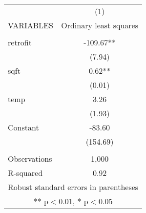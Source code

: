 \begin{tabular}{lc} \hline
 & (1) \\
VARIABLES & Ordinary least squares \\ \hline
 &  \\
retrofit & -109.67** \\
 & (7.94) \\
sqft & 0.62** \\
 & (0.01) \\
temp & 3.26 \\
 & (1.93) \\
Constant & -83.60 \\
 & (154.69) \\
 &  \\
Observations & 1,000 \\
 R-squared & 0.92 \\ \hline
\multicolumn{2}{c}{ Robust standard errors in parentheses} \\
\multicolumn{2}{c}{ ** p$<$0.01, * p$<$0.05} \\
\end{tabular}
